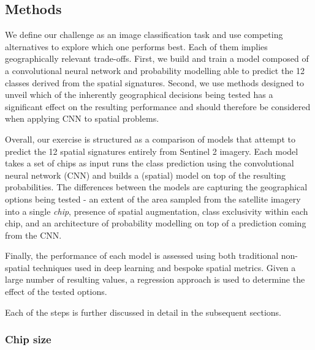 \subsection{Methods}


We define our challenge as an image classification task and use competing alternatives
to explore which one performs best. Each of them implies geographically relevant
trade-offs. First, we build and train a model composed of a convolutional neural network
and probability modelling able to predict the 12 classes derived from the spatial
signatures. Second, we use methods designed to unveil which of the inherently
geographical decisions being tested has a significant effect on the resulting
performance and should therefore be considered when applying CNN to spatial
problems.

Overall, our exercise is structured as a comparison of models that attempt to
predict the 12 spatial signatures entirely from Sentinel 2 imagery. Each model takes
a set of chips as input runs the class prediction using the convolutional neural
network (CNN) and builds a (spatial) model on top of the resulting probabilities. The
differences between the models are capturing the geographical options being tested - an
extent of the area sampled from the satellite imagery into a single \textit{chip},
presence of spatial augmentation, class exclusivity within each chip, and an
architecture of probability modelling on top of a prediction coming from the CNN.

Finally, the performance of each model is assessed using both traditional non-spatial
techniques used in deep learning and bespoke spatial metrics. Given a large number of
resulting values, a regression approach is used to determine the effect of the tested
options.

Each of the steps is further discussed in detail in the subsequent sections.

\subsubsection{Chip size}


